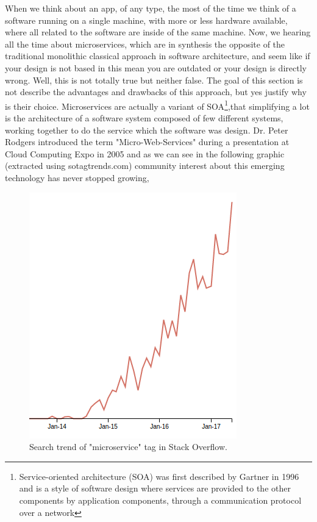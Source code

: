 When we think about an app, of any type, the most of the time we think of a software
running on a single machine, with more or less hardware available, where all
related to the software are inside of the same machine.
\intro
Now, we hearing all the time about microservices, which are in synthesis the
opposite of the traditional monolithic classical approach in software architecture,
and seem like if your design is not based in this mean you are outdated or your design is directly wrong.
Well, this is not totally true but neither false. The goal of this section is
not describe the advantages and drawbacks of this approach, but yes justify why
is their choice.
\intro
Microservices are actually a variant of SOA\footnote{Service-oriented architecture (SOA)
was first described by Gartner in 1996 and is a style of software design where
services are provided to the other components by application components, through
a communication protocol over a network},that simplifying a lot is the architecture
of a software system composed of few
different systems, working together to do the service which the software was design.
Dr. Peter Rodgers introduced the term "Micro-Web-Services" during a presentation
at Cloud Computing Expo in 2005 and as we can see in the following graphic (extracted
using sotagtrends.com) community interest about this emerging technology
has never stopped growing,

\begin{figure}[h]
  \includegraphics[scale=0.5]{img/graphics/microservices_trend.png}
  \centering
  \caption{Search trend of "microservice" tag in Stack Overflow.}
\end{figure}

